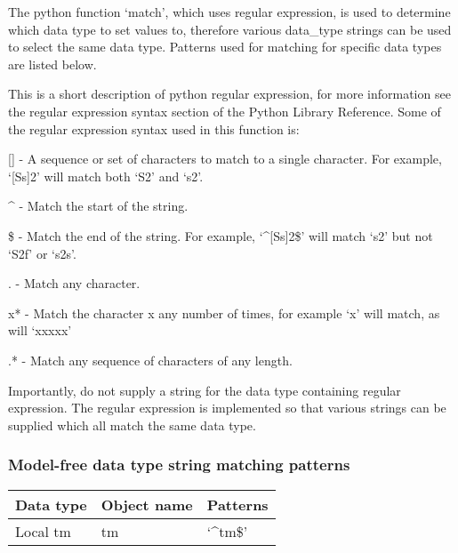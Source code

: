 The python function `match', which uses regular expression, is used to determine which data
type to set values to, therefore various data\_type strings can be used to select the same
data type.  Patterns used for matching for specific data types are listed below.

This is a short description of python regular expression, for more information see the
regular expression syntax section of the Python Library Reference.  Some of the regular
expression syntax used in this function is:

    [] - A sequence or set of characters to match to a single character.  For example,
    `[Ss]2' will match both `S2' and `s2'.

    \^{} - Match the start of the string.

    \$ - Match the end of the string.  For example, `\^{}[Ss]2\$' will match `s2' but not `S2f'
    or `s2s'.

    . - Match any character.

    x* - Match the character x any number of times, for example `x' will match, as will
    `xxxxx'

    .* - Match any sequence of characters of any length.

Importantly, do not supply a string for the data type containing regular expression.  The
regular expression is implemented so that various strings can be supplied which all match
the same data type.


\subsubsection{Model-free data type string matching patterns}



\begin{center}
\begin{tabular}{lll}
\toprule
Data type & Object name & Patterns \\
\midrule
 Local tm                &  tm            &  `\^{}tm\$'                                            \\
\bottomrule
\end{tabular}
\end{center}

